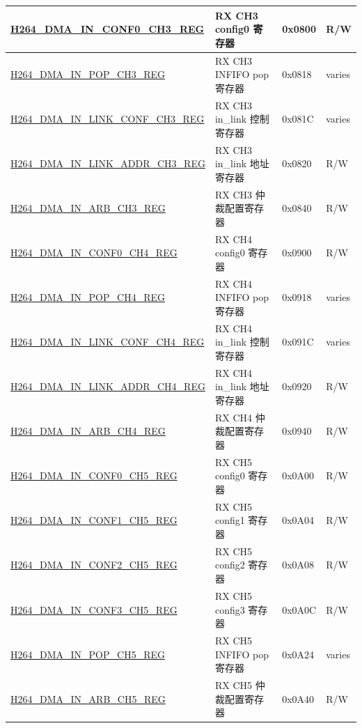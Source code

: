 \begin{longtable}{ | p{7.5cm} | p{5.7cm} | p{1.2cm} | p{1.5cm} | }
    \hyperref[regdesc:H264DMAINCONF0CH3REG]{H264\_DMA\_IN\_CONF0\_CH3\_REG} & RX CH3 config0 寄存器 & 0x0800 & R/W \\ \hline
    \hyperref[regdesc:H264DMAINPOPCH3REG]{H264\_DMA\_IN\_POP\_CH3\_REG} & RX CH3 INFIFO pop 寄存器 & 0x0818 & varies \\ \hline
    \hyperref[regdesc:H264DMAINLINKCONFCH3REG]{H264\_DMA\_IN\_LINK\_CONF\_CH3\_REG} & RX CH3 in\_link 控制寄存器 & 0x081C & varies \\ \hline
    \hyperref[regdesc:H264DMAINLINKADDRCH3REG]{H264\_DMA\_IN\_LINK\_ADDR\_CH3\_REG} & RX CH3 in\_link 地址寄存器 & 0x0820 & R/W \\ \hline
    \hyperref[regdesc:H264DMAINARBCH3REG]{H264\_DMA\_IN\_ARB\_CH3\_REG} & RX CH3 仲裁配置寄存器 & 0x0840 & R/W \\ \hline

    \hyperref[regdesc:H264DMAINCONF0CH4REG]{H264\_DMA\_IN\_CONF0\_CH4\_REG} & RX CH4 config0 寄存器 & 0x0900 & R/W \\ \hline
    \hyperref[regdesc:H264DMAINPOPCH4REG]{H264\_DMA\_IN\_POP\_CH4\_REG} & RX CH4 INFIFO pop 寄存器 & 0x0918 & varies \\ \hline
    \hyperref[regdesc:H264DMAINLINKCONFCH4REG]{H264\_DMA\_IN\_LINK\_CONF\_CH4\_REG} & RX CH4 in\_link 控制寄存器 & 0x091C & varies \\ \hline
    \hyperref[regdesc:H264DMAINLINKADDRCH4REG]{H264\_DMA\_IN\_LINK\_ADDR\_CH4\_REG} & RX CH4 in\_link 地址寄存器 & 0x0920 & R/W \\ \hline
    \hyperref[regdesc:H264DMAINARBCH4REG]{H264\_DMA\_IN\_ARB\_CH4\_REG} & RX CH4 仲裁配置寄存器 & 0x0940 & R/W \\ \hline



    \hyperref[regdesc:H264DMAINCONF0CH5REG]{H264\_DMA\_IN\_CONF0\_CH5\_REG} & RX CH5 config0 寄存器 & 0x0A00 & R/W \\ \hline
    \hyperref[regdesc:H264DMAINCONF1CH5REG]{H264\_DMA\_IN\_CONF1\_CH5\_REG} & RX CH5 config1 寄存器 & 0x0A04 & R/W \\ \hline
    \hyperref[regdesc:H264DMAINCONF2CH5REG]{H264\_DMA\_IN\_CONF2\_CH5\_REG} & RX CH5 config2 寄存器 & 0x0A08 & R/W \\ \hline
    \hyperref[regdesc:H264DMAINCONF3CH5REG]{H264\_DMA\_IN\_CONF3\_CH5\_REG} & RX CH5 config3 寄存器 & 0x0A0C & R/W \\ \hline
    \hyperref[regdesc:H264DMAINPOPCH5REG]{H264\_DMA\_IN\_POP\_CH5\_REG} & RX CH5 INFIFO pop 寄存器 & 0x0A24 & varies \\ \hline
    \hyperref[regdesc:H264DMAINARBCH5REG]{H264\_DMA\_IN\_ARB\_CH5\_REG} & RX CH5 仲裁配置寄存器 & 0x0A40 & R/W \\ \hline


\end{longtable}
